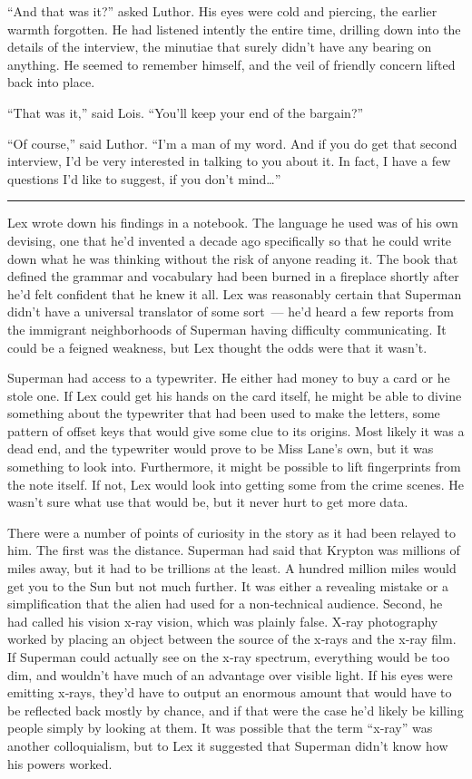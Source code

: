 \documentclass[ebook,12pt]{memoir}
\begin{document}
``And that was it?'' asked Luthor. His eyes were cold and piercing, the
earlier warmth forgotten. He had listened intently the entire time,
drilling down into the details of the interview, the minutiae that
surely didn't have any bearing on anything. He seemed to remember
himself, and the veil of friendly concern lifted back into place.

``That was it,'' said Lois. ``You'll keep your end of the bargain?''

``Of course,'' said Luthor. ``I'm a man of my word. And if you do get
that second interview, I'd be very interested in talking to you about
it. In fact, I have a few questions I'd like to suggest, if you don't
mind\ldots{}''

\begin{center}\rule{0.5\linewidth}{0.5pt}\end{center}

Lex wrote down his findings in a notebook. The language he used was of
his own devising, one that he'd invented a decade ago specifically so
that he could write down what he was thinking without the risk of anyone
reading it. The book that defined the grammar and vocabulary had been
burned in a fireplace shortly after he'd felt confident that he knew it
all. Lex was reasonably certain that Superman didn't have a universal
translator of some sort~--- he'd heard a few reports from the immigrant
neighborhoods of Superman having difficulty communicating. It could be a
feigned weakness, but Lex thought the odds were that it wasn't.

Superman had access to a typewriter. He either had money to buy a card
or he stole one. If Lex could get his hands on the card itself, he might
be able to divine something about the typewriter that had been used to
make the letters, some pattern of offset keys that would give some clue
to its origins. Most likely it was a dead end, and the typewriter would
prove to be Miss Lane's own, but it was something to look into.
Furthermore, it might be possible to lift fingerprints from the note
itself. If not, Lex would look into getting some from the crime scenes.
He wasn't sure what use that would be, but it never hurt to get more
data.

There were a number of points of curiosity in the story as it had been
relayed to him. The first was the distance. Superman had said that
Krypton was millions of miles away, but it had to be trillions at the
least. A hundred million miles would get you to the Sun but not much
further. It was either a revealing mistake or a simplification that the
alien had used for a non‐technical audience. Second, he had called his
vision x‐ray vision, which was plainly false. X‐ray photography worked
by placing an object between the source of the x‐rays and the x‐ray
film. If Superman could actually see on the x‐ray spectrum, everything
would be too dim, and wouldn't have much of an advantage over visible
light. If his eyes were emitting x‐rays, they'd have to output an
enormous amount that would have to be reflected back mostly by chance,
and if that were the case he'd likely be killing people simply by
looking at them. It was possible that the term ``x‐ray'' was another
colloquialism, but to Lex it suggested that Superman didn't know how his
powers worked.
\end{document}
